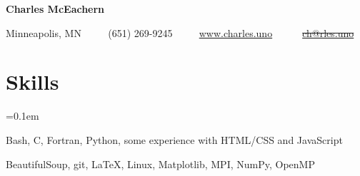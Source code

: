 \documentclass[11pt,letterpaper]{article}
\newcommand{\ResumeSection}[1]{
  \section*{ {\color{MidnightBlue}#1 \sout{\hfill} } } }
\newcommand{\URL}[1]{\href{#1}{#1}\xspace}
\newcommand{\CPP}{
  C\nolinebreak[4]\hspace{-.05em}\raisebox{.22ex}{\footnotesize\bf ++}\xspace}
\begin{document}


\begin{center}
  { \Huge \textbf{Charles McEachern} }

  \vspace{7px}

  Minneapolis, MN
  \ \ \textbullet
  \ \ (651) 269-9245
  \ \ \textbullet
  \ \ \URL{www.charles.uno}
  \ \ \textbullet
  \ \ \sout{ \href{mailto:ch@rles.uno}{ch@rles.uno} }

  \vspace{3px}

\end{center}


\ResumeSection{Skills}

\begin{description}[leftmargin=!, labelindent=\parindent, 
                    labelwidth=\widthof{\bfseries Languages}]
  \parskip=0.1em

  \item[Languages]
    Bash, \CPP, Fortran, Python, some experience with HTML/CSS and JavaScript

  \item[Tools]
    BeautifulSoup, git, \LaTeX, Linux, Matplotlib, MPI, NumPy, OpenMP

\end{description}

\end{document}
